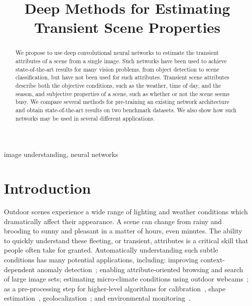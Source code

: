 \documentclass{article}
\title{Deep Methods for Estimating Transient Scene Properties}
\begin{document}
\maketitle

\begin{abstract}

We propose to use deep convolutional neural networks to estimate the
transient attributes of a scene from a single image. Such networks
have been used to achieve state-of-the-art results for many 
vision problems, from object detection to scene classification, but
have not been used for such attributes. Transient scene attributes
describe both the objective conditions, such as the weather, time of
day, and the season, and subjective properties of a scene, such as 
whether or not the scene seems busy. We compare several methods for
pre-training an existing network architecture and obtain
state-of-the-art results on two benchmark datasets.  We also show how
such networks may be used in several different applications.

\end{abstract}

\begin{keywords}
image understanding, neural networks
\end{keywords}

\section{Introduction}
\indent

Outdoor scenes experience a wide range of lighting and weather
conditions which dramatically affect their appearance. A scene can
change from rainy and brooding to sunny and pleasant in a matter of
hours, even minutes. The ability to quickly understand these fleeting,
or transient, attributes is a critical skill that people often take
for granted. Automatically understanding such subtle
conditions has many potential applications, including: improving
context-dependent anomaly detection~\cite{abrams12lost}; enabling
attribute-oriented browsing and search of large image
sets\cite{jacobs07amos,skyfinder}; estimating micro-climate conditions
using outdoor webcams~\cite{islam13webcamweather}; as a pre-processing
step for higher-level algorithms for
calibration~\cite{jacobs13cloudcalibration,workman2014rainbow}, shape
estimation~\cite{heliometric,abramsheliometric},
geolocalization~\cite{jacobs07geolocate}; and  environmental
monitoring~\cite{jacobs09webcamgis}. 
\end{document}
